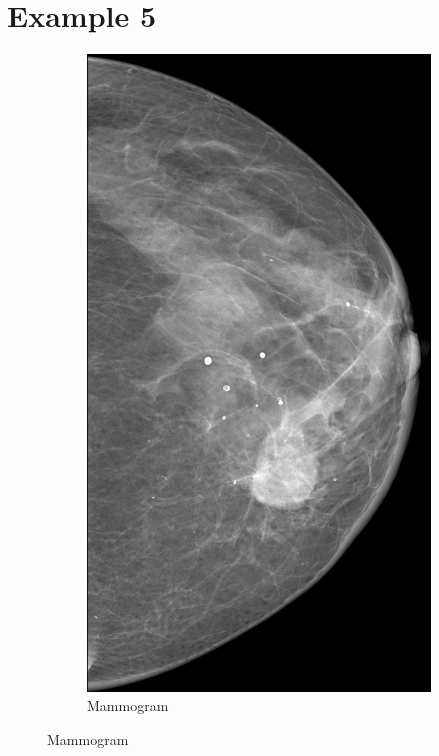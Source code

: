 \newpage
\section{Example 5}
\begin{figure}[h]
	\centering
	\begin{subfigure}{0.2\textwidth}
		\centering
			\includegraphics[width=\textwidth]{plots/examples/mammogram_5.png}
         \caption{Mammogram}

\end{subfigure}
\end{figure}
